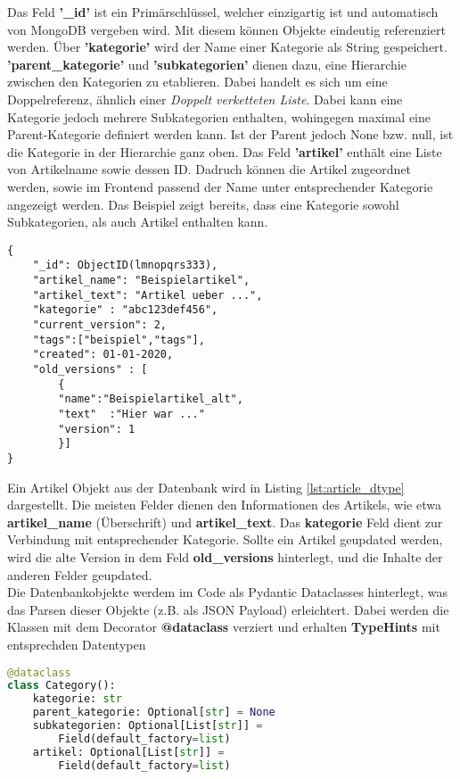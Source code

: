 Das Feld \textbf{'\_id'} ist ein Primärschlüssel, welcher einzigartig ist und automatisch von MongoDB vergeben wird. 
Mit diesem können Objekte eindeutig referenziert werden.
Über \textbf{'kategorie'} wird der Name einer Kategorie als String gespeichert.
\textbf{'parent\_kategorie'} und \textbf{'subkategorien'} dienen dazu, eine Hierarchie zwischen den Kategorien zu etablieren. Dabei handelt es sich um eine Doppelreferenz, ähnlich einer \textit{Doppelt verketteten Liste}.
Dabei kann eine Kategorie jedoch mehrere Subkategorien enthalten, wohingegen maximal eine Parent-Kategorie definiert werden kann.
Ist der Parent jedoch None bzw. null, ist die Kategorie in der Hierarchie ganz oben.
Das Feld \textbf{'artikel'} enthält eine Liste von Artikelname sowie dessen ID. 
Dadruch können die Artikel zugeordnet werden, sowie im Frontend passend der Name unter entsprechender Kategorie angezeigt werden.
Das Beispiel zeigt bereits, dass eine Kategorie sowohl Subkategorien, als auch Artikel enthalten kann. \\

\begin{lstlisting}[caption={Artikel Objekt},captionpos=b,showstringspaces=false, basicstyle=\small,label={lst:article_dtype}]
{
    "_id": ObjectID(lmnopqrs333),
    "artikel_name": "Beispielartikel",
    "artikel_text": "Artikel ueber ...",
    "kategorie" : "abc123def456",
    "current_version": 2,
    "tags":["beispiel","tags"],
    "created": 01-01-2020,
    "old_versions" : [
        {
        "name":"Beispielartikel_alt",
        "text"  :"Hier war ..."
        "version": 1
        }]
}
\end{lstlisting}

Ein Artikel Objekt aus der Datenbank wird in Listing \ref{lst:article_dtype} dargestellt.
Die meisten Felder dienen den Informationen des Artikels, wie etwa \textbf{artikel\_name} (Überschrift) und \textbf{artikel\_text}.
Das \textbf{kategorie} Feld dient zur Verbindung mit entsprechender Kategorie.
Sollte ein Artikel geupdated werden, wird die alte Version in dem Feld \textbf{old\_versions} hinterlegt, und die Inhalte der anderen Felder geupdated.\\

Die Datenbankobjekte werdem im Code als Pydantic Dataclasses hinterlegt, was das Parsen dieser Objekte (z.B. als JSON Payload) erleichtert. 
Dabei werden die Klassen mit dem Decorator \textbf{@dataclass} verziert und erhalten \textbf{TypeHints} mit entsprechden Datentypen

\begin{lstlisting}[language=python,caption={Kategorie Dataclass},captionpos=b,showstringspaces=false, basicstyle=\small,label={lst:dataclass}]
@dataclass
class Category():
    kategorie: str
    parent_kategorie: Optional[str] = None
    subkategorien: Optional[List[str]] =
        Field(default_factory=list)
    artikel: Optional[List[str]] =
        Field(default_factory=list)
\end{lstlisting}

